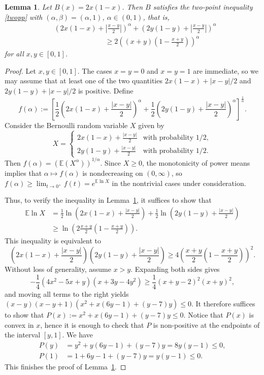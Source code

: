 \documentclass[11pt]{amsart}
\newtheorem{lemma}[theorem]{Lemma}
\theoremstyle{definition}
\newcommand{\E}{\mathbb{E}}
\renewcommand{\1}{{\mathbbm{1}}}
\begin{document}
\begin{lemma}\label{teclem}
Let $B(x)=2x(1-x)$. Then $B$ satisfies the two-point inequality \eqref{twopp} with $(\alpha,\beta)=(\alpha,1)$, $\alpha \in (0,1)$, that is,
\begin{align*}
&\left( 2x(1-x)+\left|\frac{x-y}{2}\right|\right)^{\alpha}
+
\left( 2y(1-y)+\left|\frac{x-y}{2}\right|\right)^{\alpha}\\
&\hspace{3cm}\geq 2\left( (x+y)\left(1-\frac{x+y}{2}\right)\right)^{\alpha}
\end{align*}
for all $x,y \in [0,1]$.
\end{lemma}

\begin{proof}
Let $x,y\in[0,1]$. The cases $x=y=0$ and $x=y=1$ are immediate, so we may assume that at least one of the two quantities $2x(1-x)+|x-y|/2$ and $2y(1-y)+|x-y|/2$ is positive. Define
\begin{equation}\label{eq:falpha}
f(\alpha):=
\left[\frac{1}{2} \left( 2x(1-x)+\frac{|x-y|}{2}\right)^{\alpha} + \frac{1}{2}\left( 2y(1-y)+\frac{|x-y|}{2}\right)^{\alpha}\right]^{\frac{1}{\alpha}}.
\end{equation}
Consider the Bernoulli random variable $X$ given by
\[
X=
\begin{cases}
   2x(1-x)+\frac{|x-y|}{2} & \text{with probability } 1/2,\\[1mm]
   2y(1-y)+\frac{|x-y|}{2} & \text{with probability } 1/2.
\end{cases}
\]
Then $f(\alpha)= \left( \E(X^{\alpha})\right)^{1/\alpha}$. Since $X\ge 0$, the monotonicity of power means implies that $\alpha\mapsto f(\alpha)$ is nondecreasing on $(0,\infty)$, so $f(\alpha)\ge \lim_{t\to 0^+} f(t) = e^{\E\ln X}$ in the nontrivial cases under consideration.

Thus, to verify the inequality in Lemma~\ref{teclem}, it suffices to show that 
\begin{align*}
\E \ln X
&=
\frac{1}{2} \ln\left( 2x(1-x)+\frac{|x-y|}{2}\right)
+
\frac{1}{2}\ln \left( 2y(1-y)+\frac{|x-y|}{2}\right)\\
&\geq \ln \left( 2\frac{x+y}{2}\left( 1-\frac{x+y}{2}\right)\right).
\end{align*}
This inequality is equivalent to
\[
\left( 2x(1-x)+\frac{|x-y|}{2}\right)\left( 2y(1-y)+\frac{|x-y|}{2}\right)
\geq 4 \left( \frac{x+y}{2}\left( 1-\frac{x+y}{2}\right)\right)^2 .
\]
Without loss of generality, assume $x>y$. Expanding both sides gives
\[
-\frac{1}{4}\left(  4x^2-5x+y\right)(x+3y-4y^{2})\geq \frac{1}{4}(x+y-2)^2(x+y)^2,
\]
and moving all terms to the right yields $(x-y)(x-y+1)(x^2+x(6y-1)+(y-7)y)\leq 0$. It therefore suffices to show that $P(x):=x^2+x(6y-1)+(y-7)y\leq 0$.
Notice that $P(x)$ is convex in $x$, hence it is enough to check that $P$ is non-positive at the endpoints of the interval $[y,1]$.
We have
\begin{align*}
P(y) &= y^2+y(6y-1)+(y-7)y = 8y(y-1)\leq 0,\\
P(1) &= 1+6y-1+(y-7)y = y(y-1)\leq 0.
\end{align*}
This finishes the proof of Lemma~\ref{teclem}. 
\end{proof}
\end{document}
